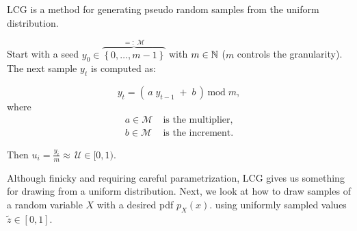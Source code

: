 \begin{frame}{\subsubsecname}

LCG is a method for generating pseudo random samples from the uniform distribution.

Start with a seed $y_0 \in \overbrace{\left\{0,\ldots,m-1\right\}}^{=:\;\mathcal{M}}$ with $m \in \mathbb{N}$ ($m$ controls the granularity). 
The next sample $y_t$ is computed as:

\begin{equation}
y_t = \left( \, a \; y_{t-1} \; + \; b \, \right) \, \text{mod} \; m,
\end{equation}
where\\[-0.7cm]
\begin{align*}
a \in \mathcal{M}&\; \text{is the multiplier,} \\
b \in \mathcal{M}&\; \text{is the increment.}
\end{align*}

Then $u_i = \frac{y_i}{m} \approx \,\mathcal{U} \in \lbrack0, 1)$.

\pause


\end{frame}

\begin{frame}

Although finicky and requiring careful parametrization, LCG gives us something for drawing from a uniform distribution. 
\svspace{5mm}
Next, we look at how to draw samples of a random variable $X$ with a desired pdf $p_X(x)$. 
using uniformly sampled values $\tilde z \in [0,1]$.

\end{frame}

